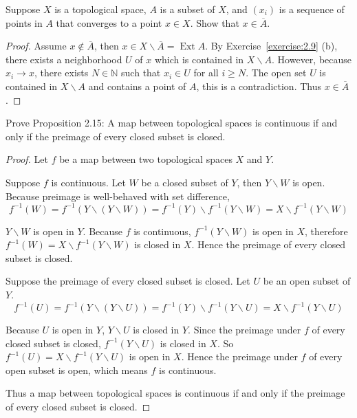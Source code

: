 \begin{exercise}{2.14}\label{exercise:2.14}
	Suppose $X$ is a topological space, $A$ is a subset of $X$, and ${(x_{i})}$ is a sequence of points in $A$ that converges to a point $x\in X$. Show that $x\in\overline{A}$.
\end{exercise}

\begin{proof}
	Assume $x\notin \overline{A}$, then $x\in X\smallsetminus\overline{A} = \operatorname{Ext} A$. By Exercise~\ref{exercise:2.9} (b), there exists a neighborhood $U$ of $x$ which is contained in $X\smallsetminus A$. However, because $x_{i}\to x$, there exists $N\in\mathbb{N}$ such that $x_{i}\in U$ for all $i\geq N$. The open set $U$ is contained in $X\smallsetminus A$ and contains a point of $A$, this is a contradiction. Thus $x\in\overline{A}$.
\end{proof}

\begin{exercise}{2.16}
	Prove Proposition 2.15: A map between topological spaces is continuous if and only if the preimage of every closed subset is closed.
\end{exercise}

\begin{proof}
	Let $f$ be a map between two topological spaces $X$ and $Y$.

	Suppose $f$ is continuous. Let $W$ be a closed subset of $Y$, then $Y\smallsetminus W$ is open. Because preimage is well-behaved with set difference,
	\[
		f^{-1}(W) = f^{-1}(Y\smallsetminus (Y\smallsetminus W)) = f^{-1}(Y)\smallsetminus f^{-1}(Y\smallsetminus W) = X\smallsetminus f^{-1}(Y\smallsetminus W)
	\]

	$Y\smallsetminus W$ is open in $Y$. Because $f$ is continuous, $f^{-1}(Y\smallsetminus W)$ is open in $X$, therefore $f^{-1}(W) = X\smallsetminus f^{-1}(Y\smallsetminus W)$ is closed in $X$. Hence the preimage of every closed subset is closed.

	Suppose the preimage of every closed subset is closed. Let $U$ be an open subset of $Y$.
	\[
		f^{-1}(U) = f^{-1}(Y\smallsetminus (Y\smallsetminus U)) = f^{-1}(Y)\smallsetminus f^{-1}(Y\smallsetminus U) = X\smallsetminus f^{-1}(Y\smallsetminus U)
	\]

	Because $U$ is open in $Y$, $Y\smallsetminus U$ is closed in $Y$. Since the preimage under $f$ of every closed subset is closed, $f^{-1}(Y\smallsetminus U)$ is closed in $X$. So $f^{-1}(U) = X\smallsetminus f^{-1}(Y\smallsetminus U)$ is open in $X$. Hence the preimage under $f$ of every open subset is open, which means $f$ is continuous.

	Thus a map between topological spaces is continuous if and only if the preimage of every closed subset is closed.
\end{proof}

